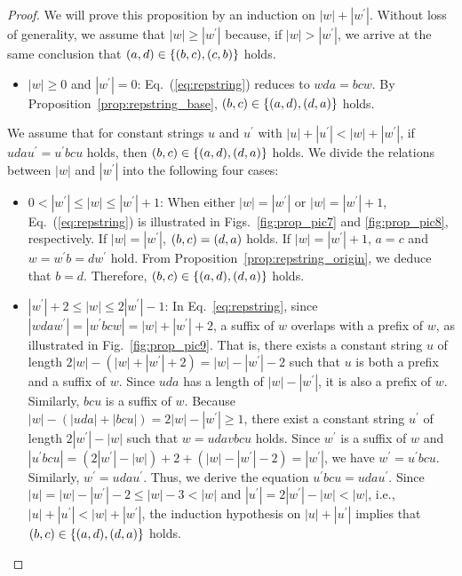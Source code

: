 \begin{proof}
We will prove this proposition by an induction on $|w| + |w^{\prime}|$.
Without loss of generality, we assume that $|w| \geq |w^{\prime}|$ because, if $|w| > |w^{\prime}|$, we arrive at the same conclusion that $(a,d) \in \{(b,c), (c,b)\}$ holds.
\begin{itemize}
  \item $|w| \geq 0$ and $|w^{\prime}|=0$:
  Eq.~(\ref{eq:repstring}) reduces to $wda = bcw$. By Proposition~\ref{prop:repstring_base}, $(b,c) \in \{(a,d), (d,a)\}$ holds.
\end{itemize}
We assume that for constant strings $u$ and $u^{\prime}$ with $|u| + |u^{\prime}| < |w| + |w^{\prime}|$, if $udau^{\prime} = u^{\prime}bcu$ holds, then $(b,c) \in \{(a,d), (d,a)\}$ holds.
We divide the relations between $|w|$ and $|w^{\prime}|$ into the following four cases:
\begin{itemize}
\item $0 < |w^{\prime}| \le |w| \le |w^{\prime}|+1$:
When either $|w|=|w^{\prime}|$ or $|w|=|w^{\prime}|+1$, Eq.~(\ref{eq:repstring}) is illustrated in Figs.~\ref{fig:prop_pic7} and \ref{fig:prop_pic8}, respectively.
If $|w|=|w^{\prime}|$, $(b,c) = (d,a)$ holds.
If $|w|=|w^{\prime}|+1$, $a = c$ and $w = w^{\prime}b = dw^{\prime}$ hold.
From Proposition~\ref{prop:repstring_origin}, we deduce that $b = d$.
Therefore, $(b,c) \in \{(a,d), (d,a)\}$ holds.
%
\item $|w^{\prime}|+2 \le |w| \le 2|w^{\prime}| - 1$:
In Eq.~\ref{eq:repstring}, since $|wdaw^{\prime}| = |w^{\prime}bcw| = |w| + |w^{\prime}| + 2$, a suffix of $w$ overlaps with a prefix of $w$, as illustrated in Fig.~\ref{fig:prop_pic9}.
That is, there exists a constant string $u$ of length $2|w| - (|w| + |w^{\prime}| + 2) = |w| - |w^{\prime}| - 2$ such that $u$ is both a prefix and a suffix of $w$.
Since $uda$ has a length of $|w| - |w^{\prime}|$, it is also a prefix of $w$. Similarly, $bcu$ is a suffix of $w$.
Because $|w| - (|uda| + |bcu|) = 2|w| - |w^{\prime}| \ge 1$, there exist a constant string $u^{\prime}$ of length $2|w^{\prime}| - |w|$ such that $w = udavbcu$ holds.
Since $w^{\prime}$ is a suffix of $w$ and $|u^{\prime}bcu| = (2|w^{\prime}| - |w|) + 2 + (|w| - |w^{\prime}| - 2) = |w^{\prime}|$, we have $w^{\prime} = u^{\prime}bcu$.
Similarly, $w^{\prime} = udau^{\prime}$. Thus, we derive the equation $u^{\prime}bcu = udau^{\prime}$.
Since $|u| = |w| - |w^{\prime}| - 2 \leq |w| - 3 < |w|$ and $|u^{\prime}| = 2|w^{\prime}| - |w| < |w|$, i.e., $|u| + |u^{\prime}| < |w| + |w^{\prime}|$, the induction hypothesis on $|u| + |u^{\prime}|$ implies that $(b,c) \in \{(a,d), (d,a)\}$ holds.

\end{itemize}
\end{proof}
